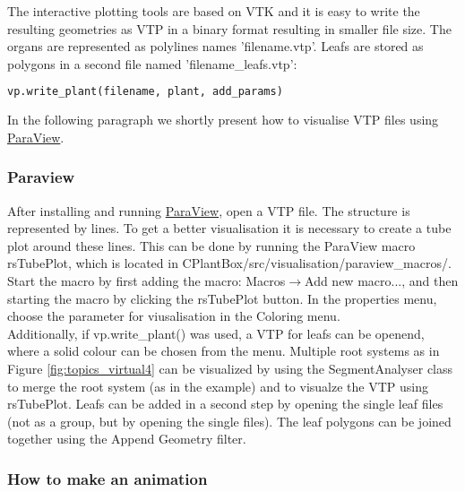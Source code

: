 The interactive plotting tools are based on VTK and it is easy to write the resulting geometries as VTP in a binary format resulting in smaller file size. The organs are represented as polylines names 'filename.vtp'. Leafs are stored as polygons in a second file named 'filename\_leafs.vtp':
\begin{lstlisting}[language=Python]
vp.write_plant(filename, plant, add_params)
\end{lstlisting}



In the following paragraph we shortly present how to visualise VTP files using \href{https://www.paraview.org/}{ParaView}.


\subsubsection*{Paraview}

After installing and running \href{https://www.paraview.org/}{ParaView}, open a VTP file. The structure is represented by lines. To get a better visualisation it is necessary to create a tube plot around these lines. This can be done by running the ParaView macro rsTubePlot, which is located in CPlantBox/src/visualisation/paraview\_macros/. Start the macro by first adding the macro: Macros$\rightarrow$Add new macro..., and then starting the macro by clicking the rsTubePlot button. In the properties menu, choose the parameter for viusalisation in the Coloring menu.\\

Additionally, if vp.write\_plant() was used, a VTP for leafs can be openend, where a solid colour can be chosen from the menu. Multiple root systems as in Figure \ref{fig:topics_virtual4} can be visualized by using the SegmentAnalyser class to merge the root system (as in the example) and to visualze the 
VTP using rsTubePlot. Leafs can be added in a second step by opening the single leaf files (not as a group, but by opening the single files). The leaf polygons can be joined together using the Append Geometry filter.

\subsubsection*{How to make an animation} 

